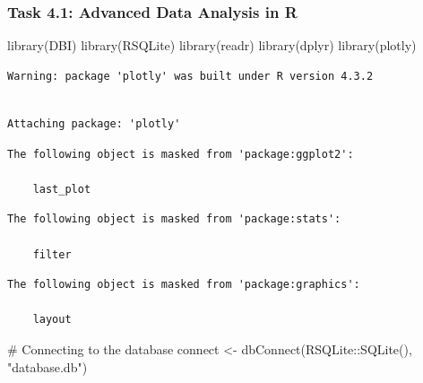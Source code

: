 \documentclass[
  letterpaper,
  DIV=11,
  numbers=noendperiod]{scrartcl}
\newenvironment{Shaded}{\begin{snugshade}}{\end{snugshade}}
\newcommand{\CommentTok}[1]{\textcolor[rgb]{0.37,0.37,0.37}{#1}}
\newcommand{\FunctionTok}[1]{\textcolor[rgb]{0.28,0.35,0.67}{#1}}
\newcommand{\NormalTok}[1]{\textcolor[rgb]{0.00,0.23,0.31}{#1}}
\newcommand{\OtherTok}[1]{\textcolor[rgb]{0.00,0.23,0.31}{#1}}
\newcommand{\SpecialCharTok}[1]{\textcolor[rgb]{0.37,0.37,0.37}{#1}}
\newcommand{\StringTok}[1]{\textcolor[rgb]{0.13,0.47,0.30}{#1}}
\begin{document}
\hypertarget{task-4.1-advanced-data-analysis-in-r}{%
\subsubsection{Task 4.1: Advanced Data Analysis in
R}\label{task-4.1-advanced-data-analysis-in-r}}

\begin{Shaded}
\begin{Highlighting}[]
\FunctionTok{library}\NormalTok{(DBI)}
\FunctionTok{library}\NormalTok{(RSQLite)}
\FunctionTok{library}\NormalTok{(readr)}
\FunctionTok{library}\NormalTok{(dplyr)}
\FunctionTok{library}\NormalTok{(plotly)}
\end{Highlighting}
\end{Shaded}

\begin{verbatim}
Warning: package 'plotly' was built under R version 4.3.2
\end{verbatim}

\begin{verbatim}

Attaching package: 'plotly'
\end{verbatim}

\begin{verbatim}
The following object is masked from 'package:ggplot2':

    last_plot
\end{verbatim}

\begin{verbatim}
The following object is masked from 'package:stats':

    filter
\end{verbatim}

\begin{verbatim}
The following object is masked from 'package:graphics':

    layout
\end{verbatim}

\begin{Shaded}
\begin{Highlighting}[]
\CommentTok{\# Connecting to the database}
\NormalTok{connect }\OtherTok{\textless{}{-}} \FunctionTok{dbConnect}\NormalTok{(RSQLite}\SpecialCharTok{::}\FunctionTok{SQLite}\NormalTok{(), }\StringTok{"database.db"}\NormalTok{)}
\end{Highlighting}
\end{Shaded}
\end{document}
